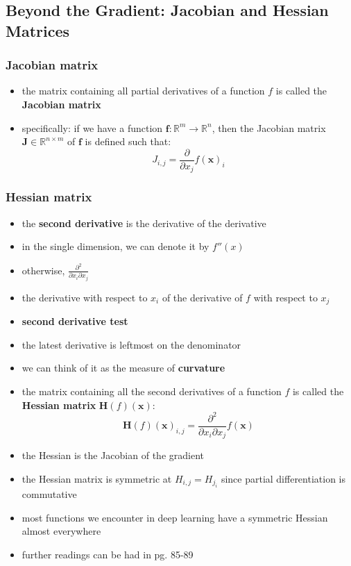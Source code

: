 \documentclass[11pt, twocolumn]{report}
\def\realnumbers{\mathbb{R}}
\begin{document}
\subsection{Beyond the Gradient: Jacobian and Hessian Matrices}
\subsubsection{Jacobian matrix}
\begin{itemize}
  \item the matrix containing all partial derivatives of a function $f$ is
    called the \textbf{Jacobian matrix}
  \item specifically: if we have a function $\bm{f} : \realnumbers^m \to
    \realnumbers^n$, then the Jacobian matrix $\bm{J} \in \realnumbers^{n
      \times m}$ of $\bm{f}$ is defined such that:
    \begin{equation}
      J_{i, j} = \frac{\partial}{\partial x_j} f(\bm{x})_i
    \end{equation}
\end{itemize}

\subsubsection{Hessian matrix}
\begin{itemize}
  \item the \textbf{second derivative} is the derivative of the derivative
  \item in the single dimension, we can denote it by $f''(x)$
  \item otherwise, $\frac{\partial^2}{\partial x_i \partial x_j}$
  \item the derivative with respect to $x_i$ of the derivative of $f$ with
    respect to $x_j$
  \item \textbf{second derivative test}
  \item the latest derivative is leftmost on the denominator
  \item we can think of it as the measure of \textbf{curvature}
  \item the matrix containing all the second derivatives of a function $f$ is
    called the \textbf{Hessian matrix} $\bm{H}(f)(\bm{x})$:   
    \begin{equation}
      \bm{H}(f)(\bm{x})_{i, j} = \frac{\partial^2}{\partial x_i \partial x_j}
      f(\bm{x})
    \end{equation}
  \item the Hessian is the Jacobian of the gradient
  \item the Hessian matrix is symmetric at $H_{i, j} = H_{j_i}$ since partial
    differentiation is commutative
  \item most functions we encounter in deep learning have a symmetric Hessian
    almost everywhere
  \item further readings can be had in pg. 85-89
\end{itemize}
\end{document}
